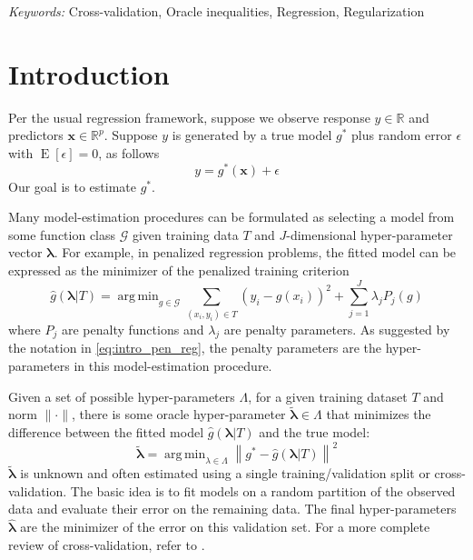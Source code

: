 \documentclass[12pt]{article}
\DeclareMathOperator*{\argmin}{arg\,min}
\begin{document}
\noindent%
{\it Keywords:}  Cross-validation, Oracle inequalities, Regression, Regularization
\vfill

\newpage
{} %
\section{Introduction}

Per the usual regression framework, suppose we observe response $y \in \mathbb{R}$ and predictors $\boldsymbol {x} \in \mathbb{R}^p$. Suppose $y$ is generated by a true model $g^*$ plus random error $\epsilon$ with $\operatorname{E}\left[\epsilon\right] = 0$, as follows
\begin{equation}
\label{true_model}
y = g^*(\boldsymbol x) + \epsilon
\end{equation}
Our goal is to estimate $g^*$.

Many model-estimation procedures can be formulated as selecting a model from some function class $\mathcal{G}$ given training data $T$ and $J$-dimensional hyper-parameter vector $\boldsymbol{\lambda}$. For example, in penalized regression problems, the fitted model can be expressed as the minimizer of the penalized training criterion
\begin{equation}
\label{eq:intro_pen_reg}
\hat{g}(\boldsymbol \lambda | T) = \argmin_{g\in \mathcal{G}} \sum_{(x_i, y_i) \in T} \left (y_i -  g(x_i) \right )^2 + \sum_{j=1}^J \lambda_j P_j(g)
\end{equation}
where $P_j$ are penalty functions and $\lambda_j$ are penalty parameters. As suggested by the notation in \eqref{eq:intro_pen_reg}, the penalty parameters are the hyper-parameters in this model-estimation procedure.

Given a set of possible hyper-parameters $\Lambda$, for a given training dataset $T$ and norm $\|\cdot\|$, there is some oracle hyper-parameter $\tilde{\boldsymbol{\lambda}} \in \Lambda$ that minimizes the difference between the fitted model $\hat{g}\left(\boldsymbol{\lambda|}T\right)$ and the true model:
\[
\tilde{\boldsymbol{\lambda}} = \argmin_{\lambda \in \Lambda} \left\|g^{*} - \hat{g}\left(\boldsymbol{\lambda|}T\right)\right\|^2
\]
$\tilde{\boldsymbol{\lambda}}$ is unknown and often estimated using a single training/validation split or cross-validation. The basic idea is to fit models on a random partition of the observed data and evaluate their error on the remaining data. The final hyper-parameters $\hat{\boldsymbol{\lambda}}$ are the minimizer of the error on this validation set. For a more complete review of cross-validation, refer to \citet{arlot2010survey}.
\end{document}
